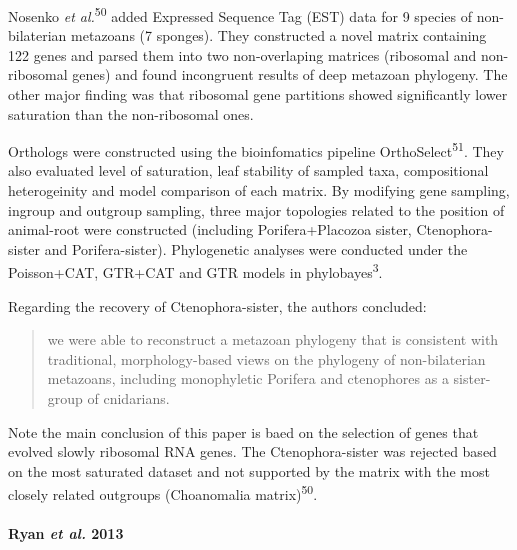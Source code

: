 \documentclass[]{article}
\let\oldparagraph\paragraph
\renewcommand{\paragraph}[1]{\oldparagraph{#1}\mbox{}}
\begin{document}
Nosenko \emph{et al.}\textsuperscript{50} added Expressed Sequence Tag
(EST) data for 9 species of non-bilaterian metazoans (7 sponges). They
constructed a novel matrix containing 122 genes and parsed them into two
non-overlaping matrices (ribosomal and non-ribosomal genes) and found
incongruent results of deep metazoan phylogeny. The other major finding
was that ribosomal gene partitions showed significantly lower saturation
than the non-ribosomal ones.

Orthologs were constructed using the bioinfomatics pipeline
OrthoSelect\textsuperscript{51}. They also evaluated level of
saturation, leaf stability of sampled taxa, compositional heterogeinity
and model comparison of each matrix. By modifying gene sampling, ingroup
and outgroup sampling, three major topologies related to the position of
animal-root were constructed (including Porifera+Placozoa sister,
Ctenophora-sister and Porifera-sister). Phylogenetic analyses were
conducted under the Poisson+CAT, GTR+CAT and GTR models in
phylobayes\textsuperscript{3}.

Regarding the recovery of Ctenophora-sister, the authors concluded:

\begin{quote}
we were able to reconstruct a metazoan phylogeny that is consistent with
traditional, morphology-based views on the phylogeny of non-bilaterian
metazoans, including monophyletic Porifera and ctenophores as a
sister-group of cnidarians.
\end{quote}

Note the main conclusion of this paper is baed on the selection of genes
that evolved slowly ribosomal RNA genes. The Ctenophora-sister was
rejected based on the most saturated dataset and not supported by the
matrix with the most closely related outgroups (Choanomalia
matrix)\textsuperscript{50}.

\hypertarget{ryan-et-al.-2013}{%
\paragraph{\texorpdfstring{Ryan \emph{et al.}
2013}{Ryan et al. 2013}}\label{ryan-et-al.-2013}}
\end{document}
